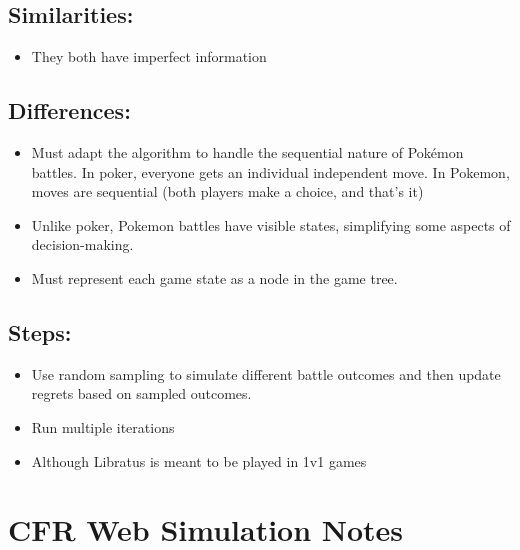 \documentclass[
]{article}
\begin{document}
\subsection{Similarities:}\label{similarities}

\begin{itemize}
\item
  They both have imperfect information
\end{itemize}

\subsection{Differences:}\label{differences}

\begin{itemize}
\item
  Must adapt the algorithm to handle the sequential nature of Pokémon
  battles. In poker, everyone gets an individual independent move. In
  Pokemon, moves are sequential (both players make a choice, and that's
  it)
\item
  Unlike poker, Pokemon battles have visible states, simplifying some
  aspects of decision-making.
\end{itemize}

\begin{itemize}
\item
  Must represent each game state as a node in the game tree.
\end{itemize}

\subsection*{Steps:}\label{steps}

\begin{itemize}
\item
  Use random sampling to simulate different battle outcomes and then
  update regrets based on sampled outcomes.
\item
  Run multiple iterations
\item
  Although Libratus is meant to be played in 1v1 games
\end{itemize}

\section*{CFR Web Simulation Notes}\label{cfr-web-simulation-notes}
\end{document}
